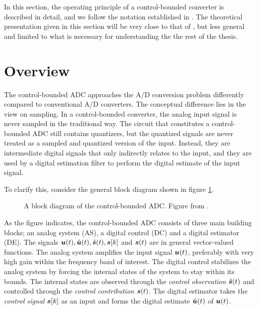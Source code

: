 In this section, the operating principle of a control-bounded converter is described in detail, and we follow the notation established in \cite{cbc_2020_loeliger}. The theoretical presentation given in this section will be very close to that of \cite{malmberg_thesis}, but less general and limited to what is necessary for understanding the the rest of the thesis.


























\section{Overview}
\label{sec:cbc_overview}
The control-bounded ADC approaches the A/D conversion problem differently compared to conventional A/D converters. The conceptual difference lies in the view on sampling. In a control-bounded converter, the analog input signal is never sampled in the traditional way. The circuit that constitutes a control-bounded ADC still contains quantizers, but the quantized signals are never treated as a sampled and quantized version of the input. Instead, they are intermediate digital signals that only indirectly relates to the input, and they are used by a digital estimation filter to perform the digital estimate of the input signal.

To clarify this, consider the general block diagram shown in figure \ref{fig:cbadc1}.
\begin{figure}[htbp]
    \centering
    
    \caption{A block diagram of the control-bounded ADC. Figure from \cite{malmberg_thesis}.}
    \label{fig:cbadc1}
\end{figure}

As the figure indicates, the control-bounded ADC consists of three main building blocks; an analog system (AS), a digital control (DC) and a digital estimator (DE). The signals $\bm{u}(t), \hat{\bm{u}}(t), \tilde{\bm{s}}(t), \bm{s}[k]$ and $\bm{s}(t)$ are in general vector-valued functions. The analog system amplifies the input signal $\bm{u}(t)$, preferably with very high gain within the frequency band of interest. The digital control stabilizes the analog system by forcing the internal states of the system to stay within its bounds. The internal states are observed through the \textit{control observation} $\tilde{\bm{s}}(t)$ and controlled through the \textit{control contribution} $\bm{s}(t)$. The digital estimator takes the \textit{control signal} $\bm{s}[k]$ as an input and forms the digital estimate $\hat{\bm{u}}(t)$ of $\bm{u}(t)$.

